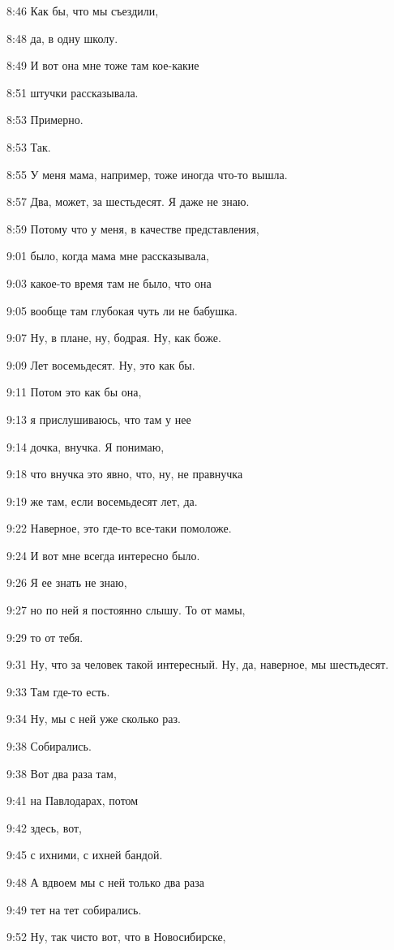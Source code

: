 8:46
Как бы, что мы съездили,

8:48
да, в одну школу.

8:49
И вот она мне тоже там кое-какие

8:51
штучки рассказывала.

8:53
Примерно.

8:53
Так.

8:55
У меня мама, например, тоже иногда что-то вышла.

8:57
Два, может, за шестьдесят. Я даже не знаю.

8:59
Потому что у меня, в качестве представления,

9:01
было, когда мама мне рассказывала,

9:03
какое-то время там не было, что она

9:05
вообще там глубокая чуть ли не бабушка.

9:07
Ну, в плане, ну, бодрая. Ну, как боже.

9:09
Лет восемьдесят. Ну, это как бы.

9:11
Потом это как бы она,

9:13
я прислушиваюсь, что там у нее

9:14
дочка, внучка. Я понимаю,

9:18
что внучка это явно, что, ну, не правнучка

9:19
же там, если восемьдесят лет, да.

9:22
Наверное, это где-то все-таки помоложе.

9:24
И вот мне всегда интересно было.

9:26
Я ее знать не знаю,

9:27
но по ней я постоянно слышу. То от мамы,

9:29
то от тебя.

9:31
Ну, что за человек такой интересный. Ну, да, наверное, мы шестьдесят.

9:33
Там где-то есть.

9:34
Ну, мы с ней уже сколько раз.

9:38
Собирались.

9:38
Вот два раза там,

9:41
на Павлодарах, потом

9:42
здесь, вот,

9:45
с ихними, с ихней бандой.

9:48
А вдвоем мы с ней только два раза

9:49
тет на тет собирались.

9:52
Ну, так чисто вот, что в Новосибирске,

